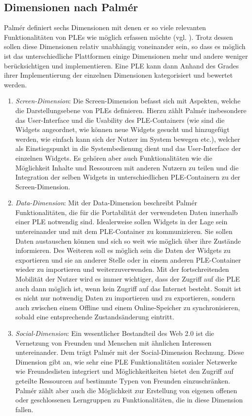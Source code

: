 \subsection{Dimensionen nach Palmér}\label{section:dimensions_palmer} 
Palmér definiert sechs Dimensionen mit denen er so viele relevanten Funktionalitäten von PLEs wie möglich erfassen möchte (vgl. \cite{Palmer2009}). Trotz dessen sollen diese Dimensionen relativ unabhängig voneinander sein, so dass es möglich ist das unterschiedliche Plattformen einige Dimensionen mehr und andere weniger berücksichtigen und implementieren. Eine PLE kann dann Anhand des Grades ihrer Implementierung der einzelnen Dimensionen kategorisiert und bewertet werden.
\begin{enumerate}
 \item \emph{Screen-Dimension}: Die Screen-Dimension befasst sich mit Aspekten, welche die Darstellungsebene von PLEs definieren. Hierzu zählt Palmér insbesondere das User-Interface und die Usability des PLE-Containers (wie sind die Widgets angeordnet, wie können neue Widgets gesucht und hinzugefügt werden, wie einfach kann sich der Nutzer im System bewegen etc.), welcher als Einstiegspunkt in die Systembedienung dient und das User-Interface der einzelnen Widgets. Es gehören aber auch Funktionalitäten wie die Möglichkeit Inhalte und Ressourcen mit anderen Nutzern zu teilen und die Integration der selben Widgets in unterschiedlichen PLE-Containern zu der Screen-Dimension.
 \item \emph{Data-Dimension}: Mit der Data-Dimension beschreibt Palmér Funktionalitäten, die für die Portabilität der verwendeten Daten innerhalb einer PLE notwendig sind. Idealerweise sollen Widgets in der Lage sein untereinander und mit dem PLE-Container zu kommunizieren. Sie sollen Daten austauschen können und sich so weit wie möglich über ihre Zustände informieren. Des Weiteren soll es möglich sein die Daten der Widgets zu exportieren und sie an anderer Stelle oder in einem anderen PLE-Container wieder zu importieren und weiterzuverwenden. Mit der fortschreitenden Mobilität der Nutzer wird es immer wichtiger, dass der Zugriff auf die PLE auch dann möglich ist, wenn kein Zugriff auf das Internet besteht. Somit ist es nicht nur notwendig Daten zu importieren und zu exportieren, sondern auch zwischen einem Offline und einem Online-Speicher zu synchronisieren, sobald eine entsprechende Zustandsänderung eintritt.
 \item \emph{Social-Dimension}: Ein wesentlicher Bestandteil des Web 2.0 ist die Vernetzung von Freunden und Menschen mit ähnlichen Interessen untereinander. Dem trägt Palmér mit der Social-Dimension Rechnung. Diese Dimension gibt an, wie sehr eine PLE Funktionalitäten sozialer Netzwerke wie Freundeslisten integriert und Möglichkeitkeiten bietet den Zugriff auf geteilte Ressourcen auf bestimmte Typen von Freunden einzuschränken. Palmér zählt aber auch die Möglichkeit zur Erstellung von eigenen offenen oder geschlossenen Lerngruppen zu Funktionalitäten, die in diese Dimension fallen.

\end{enumerate}
